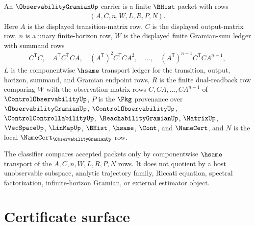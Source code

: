 \begin{definition}
\label{def:observability-gramian-carrier}
An $\ObservabilityGramianUp$ carrier is a finite $\BHist$ packet with rows
$$
\begin{aligned}
(A,C,n,W,L,R,P,N).
\end{aligned}
$$
Here $A$ is the displayed transition-matrix row, $C$ is the displayed output-matrix row, $n$ is a unary finite-horizon row, $W$ is the displayed finite Gramian-sum ledger with summand rows
$$
\begin{aligned}
C^{\mathsf T}C,\quad A^{\mathsf T}C^{\mathsf T}CA,\quad (A^{\mathsf T})^2C^{\mathsf T}CA^2,\quad \ldots,\quad (A^{\mathsf T})^{n-1}C^{\mathsf T}CA^{n-1},
\end{aligned}
$$
$L$ is the componentwise $\hsame$ transport ledger for the transition, output, horizon, summand, and Gramian endpoint rows, $R$ is the finite dual-readback row comparing $W$ with the observation-matrix rows $C,CA,\ldots,CA^{n-1}$ of $\ControlObservabilityUp$, $P$ is the $\Pkg$ provenance over $\ObservabilityGramianUp$, $\ControlObservabilityUp$, $\ControlControllabilityUp$, $\ReachabilityGramianUp$, $\MatrixUp$, $\VecSpaceUp$, $\LinMapUp$, $\BHist$, $\hsame$, $\Cont$, and $\NameCert$, and $N$ is the local $\NameCert_{\ObservabilityGramianUp}$ row.

The classifier compares accepted packets only by componentwise $\hsame$ transport of the $A,C,n,W,L,R,P,N$ rows. It does not quotient by a host unobservable subspace, analytic trajectory family, Riccati equation, spectral factorization, infinite-horizon Gramian, or external estimator object.
\end{definition}

\section{Certificate surface}
\label{sec:observability-gramian-certificate}

